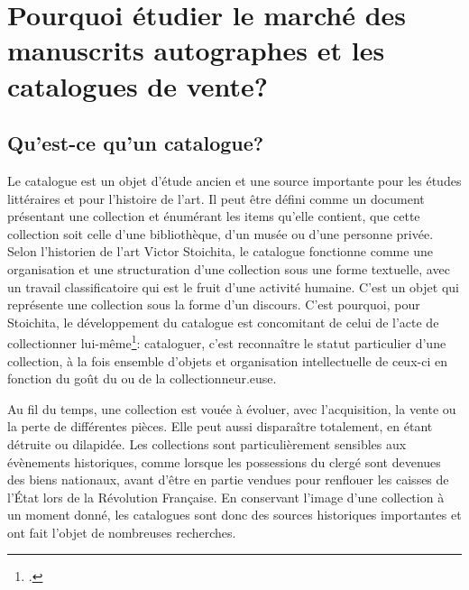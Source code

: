 \section{Pourquoi étudier le marché des manuscrits autographes et les catalogues de vente?}
\subsection{Qu'est-ce qu'un catalogue?}
Le catalogue est un objet d'étude ancien et une source importante pour les études littéraires et pour l'histoire de l'art. Il peut être défini comme un document présentant une collection et énumérant les items qu'elle contient, que cette collection soit celle d'une bibliothèque, d'un musée ou d'une personne privée. Selon l'historien de l'art Victor Stoichita, le catalogue fonctionne comme une organisation et une structuration d'une collection sous une forme textuelle, avec un travail classificatoire qui est le fruit d'une activité humaine. C'est un objet qui représente une collection sous la forme d'un discours. C'est pourquoi, pour Stoichita, le développement du catalogue est concomitant de celui de l'acte de collectionner lui-même\footcite[p. 119-124]{stoichita_instauration_1993}: cataloguer, c'est reconnaître le statut particulier d'une collection, à la fois ensemble d'objets et organisation intellectuelle de ceux-ci en fonction du goût du ou de la collectionneur.euse.

Au fil du temps, une collection est vouée à évoluer, avec l'acquisition, la vente ou la perte de différentes pièces. Elle peut aussi disparaître totalement, en étant détruite ou dilapidée. Les collections sont particulièrement sensibles aux évènements historiques, comme lorsque les possessions du clergé sont devenues des biens nationaux, avant d'être en partie vendues pour renflouer les caisses de l'État lors de la Révolution Française. En conservant l'image d'une collection à un moment donné, les catalogues sont donc des sources historiques importantes et ont fait l'objet de nombreuses recherches.

